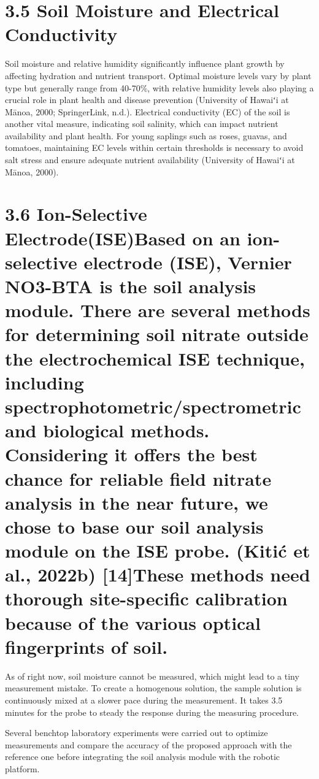 \documentclass{book} %
\begin{document}
\noindent 
\section{3.5 Soil Moisture and Electrical Conductivity}

\noindent Soil moisture and relative humidity significantly influence plant growth by affecting hydration and nutrient transport. Optimal moisture levels vary by plant type but generally range from 40-70\%, with relative humidity levels also playing a crucial role in plant health and disease prevention (University of Hawaiʻi at M\={a}noa, 2000; SpringerLink, n.d.). Electrical conductivity (EC) of the soil is another vital measure, indicating soil salinity, which can impact nutrient availability and plant health. For young saplings such as roses, guavas, and tomatoes, maintaining EC levels within certain thresholds is necessary to avoid salt stress and ensure adequate nutrient availability (University of Hawaiʻi at M\={a}noa, 2000).

\noindent 
\section{3.6 Ion-Selective Electrode(ISE)Based on an ion-selective electrode (ISE), Vernier NO3-BTA is the soil analysis module. There are several methods for determining soil nitrate outside the electrochemical ISE technique, including spectrophotometric/spectrometric and biological methods. Considering it offers the best chance for reliable field nitrate analysis in the near future, we chose to base our soil analysis module on the ISE probe. (Kiti\'{c} et al., 2022b) [14]These methods need thorough site-specific calibration because of the various optical fingerprints of soil.}

\noindent 

\noindent As of right now, soil moisture cannot be measured, which might lead to a tiny measurement mistake. To create a homogenous solution, the sample solution is continuously mixed at a slower pace during the measurement. It takes 3.5 minutes for the probe to steady the response during the measuring procedure.

\noindent 

\noindent Several benchtop laboratory experiments were carried out to optimize measurements and compare the accuracy of the proposed approach with the reference one before integrating the soil analysis module with the robotic platform. 

\noindent 
\end{document}
